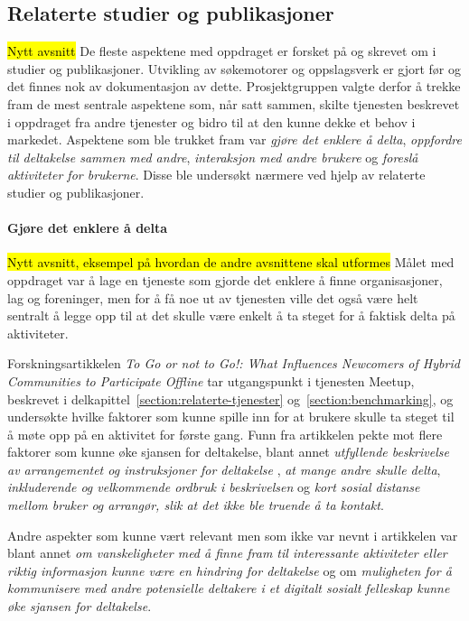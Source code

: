 \subsection{Relaterte studier og publikasjoner}
\hl{Nytt avsnitt}
De fleste aspektene med oppdraget er forsket på og skrevet om i studier og publikasjoner. Utvikling av søkemotorer og oppslagsverk er gjort før og det finnes nok av dokumentasjon av dette. Prosjektgruppen valgte derfor å trekke fram de mest sentrale aspektene som, når satt sammen, skilte tjenesten beskrevet i oppdraget fra andre tjenester og bidro til at den kunne dekke et behov i markedet. Aspektene som ble trukket fram var {\em gjøre det enklere å delta}, {\em oppfordre til deltakelse sammen med andre}, {\em interaksjon med andre brukere} og {\em foreslå aktiviteter for brukerne}. Disse ble undersøkt nærmere ved hjelp av relaterte studier og publikasjoner.

\paragraph{Gjøre det enklere å delta}
\hl{Nytt avsnitt, eksempel på hvordan de andre avsnittene skal utformes}
Målet med oppdraget var å lage en tjeneste som gjorde det enklere å finne organisasjoner, lag og foreninger, men for å få noe ut av tjenesten ville det også være helt sentralt å legge opp til at det skulle være enkelt å ta steget for å faktisk delta på aktiviteter. 

Forskningsartikkelen {\em To Go or not to Go!: What Influences Newcomers of Hybrid Communities to Participate Offline} \cite{NEWCOMERS:4:CT17} tar utgangspunkt i tjenesten Meetup, beskrevet i delkapittel~\ref{section:relaterte-tjenester} og~\ref{section:benchmarking}, og undersøkte hvilke faktorer som kunne spille inn for at brukere skulle ta steget til å møte opp på en aktivitet for første gang. Funn fra artikkelen pekte mot flere faktorer som kunne øke sjansen for deltakelse, blant annet {\em utfyllende beskrivelse av arrangementet og instruksjoner for deltakelse
}, {\em at mange andre skulle delta}, {\em inkluderende og velkommende ordbruk i beskrivelsen} og {\em kort sosial distanse mellom bruker og arrangør, slik at det ikke ble truende å ta kontakt}. 

Andre aspekter som kunne vært relevant men som ikke var nevnt i artikkelen var blant annet {\em om vanskeligheter med å finne fram til interessante aktiviteter eller riktig informasjon kunne være en hindring for deltakelse} og om {\em muligheten for å kommunisere med andre potensielle deltakere i et digitalt sosialt felleskap kunne øke sjansen for deltakelse}.

